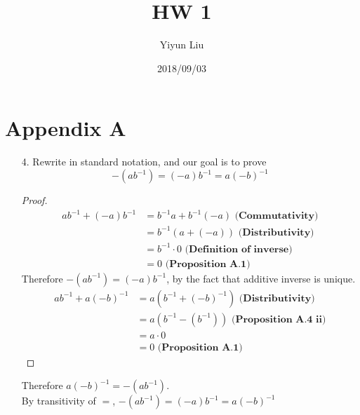 \documentclass{article}
\title{HW 1}
\date{2018/09/03}
\author{Yiyun Liu}
\begin{document}
\maketitle
\lstset{basicstyle=\ttfamily}

\section*{Appendix A}
\begin{itemize}
\item [4.] Rewrite in standard notation, and our goal is to prove
  \[-(ab^{-1})=(-a)b^{-1}=a(-b)^{-1}\]
  \begin{proof}
    \begin{equation*}
      \begin{split}
        ab^{-1}+(-a)b^{-1}
        &= b^{-1}a + b^{-1}(-a) \textbf{ (Commutativity)} \\
        &= b^{-1}(a+(-a)) \textbf{ (Distributivity)}\\
        &= b^{-1}\cdot 0 \textbf{ (Definition of inverse)}\\
        &= 0 \textbf{ (Proposition A.1)}
      \end{split}
    \end{equation*}
    Therefore $-(ab^{-1})=(-a)b^{-1}$, by the fact that additive
    inverse is unique.\\
    \begin{equation*}
      \begin{split}
        ab^{-1}+a(-b)^{-1}
        &= a(b^{-1}+(-b)^{-1}) \textbf{ (Distributivity)}\\
        &= a(b^{-1} -(b^{-1})) \textbf{ (Proposition A.4 ii)}\\
        &= a\cdot 0\\
        &= 0 \textbf{ (Proposition A.1)}
      \end{split}
    \end{equation*}
  \end{proof}
  Therefore $a(-b)^{-1}=-(ab^{-1})$.\\
  By transitivity of $=$, \(-(ab^{-1})=(-a)b^{-1}=a(-b)^{-1}\)
\end{itemize}
\end{document}
